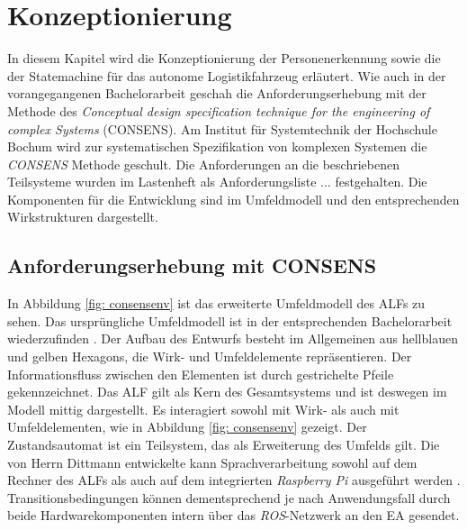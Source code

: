 \chapter{Konzeptionierung}
\label{ch: Konzeptionierung}

In diesem Kapitel wird die Konzeptionierung der Personenerkennung sowie die der Statemachine für das autonome Logistikfahrzeug erläutert. Wie auch in der vorangegangenen Bachelorarbeit geschah die Anforderungserhebung mit der Methode des \textit{Conceptual design specification technique for the engineering of complex Systems} (CONSENS). Am Institut für Systemtechnik der Hochschule Bochum wird zur systematischen Spezifikation von komplexen Systemen die \textit{CONSENS} Methode geschult. Die Anforderungen an die beschriebenen Teilsysteme wurden im Lastenheft als Anforderungsliste ... festgehalten. Die Komponenten für die Entwicklung sind im Umfeldmodell und den entsprechenden Wirkstrukturen dargestellt.
	
	
	\section{Anforderungserhebung mit CONSENS}
	\label{sec: Anforderungserhebung}
	
	In Abbildung \ref{fig: consensenv} ist das erweiterte Umfeldmodell des ALFs zu sehen. Das ursprüngliche Umfeldmodell ist in der entsprechenden Bachelorarbeit wiederzufinden \cite{Bachelorarbeit}. Der Aufbau des Entwurfs besteht im Allgemeinen aus hellblauen und gelben Hexagons, die Wirk- und Umfeldelemente repräsentieren. Der Informationsfluss zwischen den Elementen ist durch gestrichelte Pfeile gekennzeichnet. Das ALF gilt als Kern des Gesamtsystems und ist deswegen im Modell mittig dargestellt. Es interagiert sowohl mit Wirk- als auch mit Umfeldelementen, wie in Abbildung \ref{fig: consensenv} gezeigt. Der Zustandsautomat ist ein Teilsystem, das als Erweiterung des Umfelds gilt. Die von Herrn Dittmann entwickelte kann Sprachverarbeitung sowohl auf dem Rechner des ALFs als auch auf dem integrierten \textit{Raspberry Pi} ausgeführt werden \cite{Dittmann}. Transitionsbedingungen können dementsprechend je nach Anwendungsfall durch beide Hardwarekomponenten intern über das \textit{ROS}-Netzwerk an den EA gesendet.       \\
	
		
	
